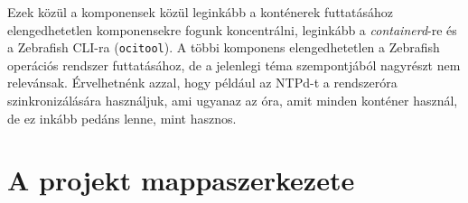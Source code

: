 Ezek közül a komponensek közül leginkább a konténerek futtatásához elengedhetetlen komponensekre fogunk koncentrálni, leginkább a \textit{containerd}-re és a Zebrafish CLI-ra (\texttt{ocitool}). A többi komponens elengedhetetlen a Zebrafish operációs rendszer futtatásához, de a jelenlegi téma szempontjából nagyrészt nem relevánsak. Érvelhetnénk azzal, hogy például az NTPd-t a rendszeróra szinkronizálására használjuk, ami ugyanaz az óra, amit minden konténer használ, de ez inkább pedáns lenne, mint hasznos.

\pagebreak

\section{A projekt mappaszerkezete}


\pagebreak

